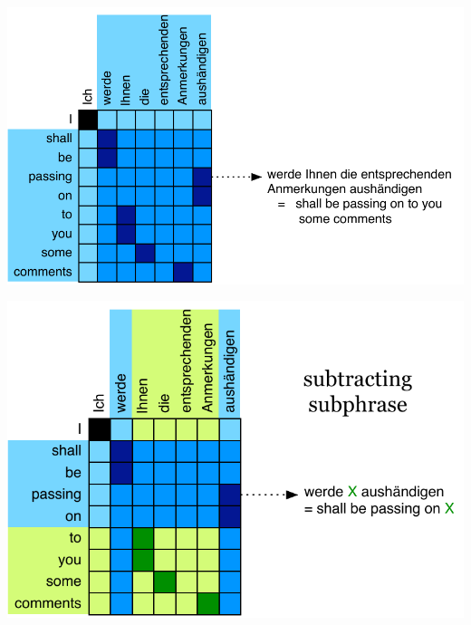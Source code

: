 \documentclass[landscape]{slides}
\begin{document}
\begin{center}
\includegraphics[scale=1.4]{hierarchical-phrase-extraction3.pdf}
\end{center}


\begin{center}
\includegraphics[scale=1.4]{hierarchical-phrase-extraction4.pdf}
\end{center}

\end{document}
